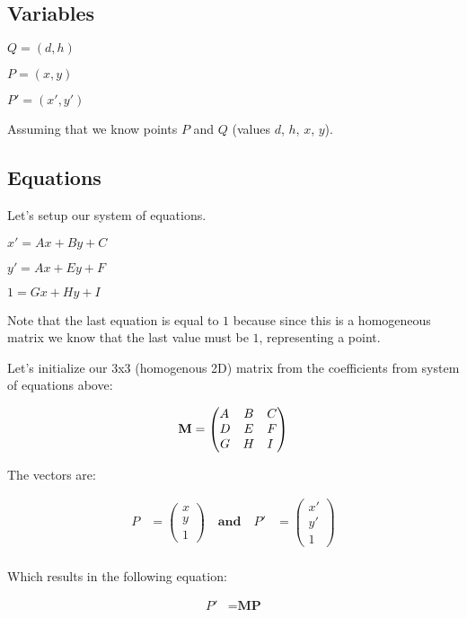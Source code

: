 \documentclass[12pt]{article}
\begin{document}
\subsection{Variables}

$Q = (d, h)$

$P = (x,y)$

$P' = (x', y')$

Assuming that we know points $P$ and $Q$ (values $d$, $h$, $x$, $y$).

\subsection{Equations}

Let's setup our system of equations.

$x' = Ax + By + C$

$y' = Ax + Ey + F$

$1  = Gx + Hy + I$

Note that the last equation is equal to $1$ because 
since this is a homogeneous matrix we know that the 
last value must be $1$, representing a point.

Let's initialize our 3x3 (homogenous 2D) matrix from the 
coefficients from system of equations above:

\begin{align}
\textbf{M} &=
\begin{pmatrix}
A \hfill & B & C \\
D & E & F \hfill \\
G & H & I \hfill 
\end{pmatrix} \nonumber \\
\end{align}

The vectors are:

\begin{align}
P &=
\begin{pmatrix}
x \\
y \\
1  
\end{pmatrix} \nonumber 
\quad
\textbf{and}
\quad 
P' &=
\begin{pmatrix}
x' \\
y' \\
1  
\end{pmatrix} \nonumber \\
\end{align}

Which results in the following equation:

\begin{align}
P' &= \textbf{M} \textbf{P}
\end{align}
\end{document}
